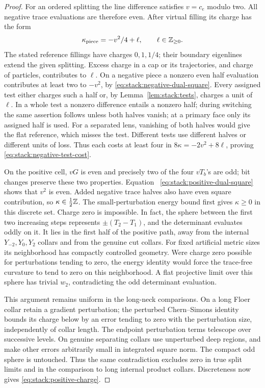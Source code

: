 \begin{proof}
For an ordered splitting the line difference satisfies \(v=c_e\)
modulo two.  All negative trace evaluations are therefore even.
After virtual filling its charge has the form
\[
 \kappa_{\rm piece}=-v^2/4+\ell,\qquad
 \ell\in\mathbb Z_{\ge0}.
\]
The stated reference fillings have charges \(0,1,1/4\); their
boundary eigenlines extend the given splitting.  Excess charge in a
cap or its trajectories, and charge of particles, contributes to
\(\ell\).  On a negative piece a nonzero even half evaluation
contributes at least two to \(-v^2\), by
\eqref{eq:stack:negative-dual-square}.  Every assigned test either
charges such a half or, by Lemma~\ref{lem:stack:tests}, charges a
unit of \(\ell\).  In a whole test a nonzero difference entails a
nonzero half; during switching the same assertion follows unless
both halves vanish; at a primary face only its assigned half is used.
For a separated lens, vanishing of both halves would give the flat
reference, which misses the test.  Different tests use different
halves or different units of loss.  Thus each costs at least four in
\(8\kappa=-2v^2+8\ell\), proving
\eqref{eq:stack:negative-test-cost}.

On the positive cell, \(vG\) is even and precisely two of the four
\(vT_b\)'s are odd; bit changes preserve these two properties.  Equation~
\eqref{eq:stack:positive-dual-square} shows that \(v^2\) is even.
Added negative trace halves also have even square contribution, so
\(\kappa\in\frac12\mathbb Z\).  The small-perturbation energy bound
first gives \(\kappa\ge0\) in this discrete set.  Charge zero is
impossible.  In fact, the sphere between the first two increasing
steps represents \(\pm(T_2-T_1)\), and the determinant evaluates
oddly on it.  It lies in the first half of the positive path, away
from the internal \(Y_{-2},Y_0,Y_2\) collars and from the genuine
cut collars.  For fixed artificial metric sizes its neighborhood has
compactly controlled geometry.  Were charge zero possible for
perturbations tending to zero, the energy identity would force the
trace-free curvature to tend to zero on this neighborhood.  A flat
projective limit over this sphere has trivial \(w_2\), contradicting
the odd determinant evaluation.

This argument remains uniform in the long-neck comparisons.  On a
long Floer collar retain a gradient perturbation; the perturbed
Chern--Simons identity bounds its charge below by an error tending
to zero with the perturbation size, independently of collar length.
The endpoint perturbation terms telescope over successive levels.
On genuine separating collars use unperturbed deep regions, and
make other errors arbitrarily small in integrated square norm.
The compact odd sphere is untouched.  Thus the same contradiction
excludes zero in true split limits and in the comparison to long
internal product collars.  Discreteness now gives
\eqref{eq:stack:positive-charge}.
\end{proof}

